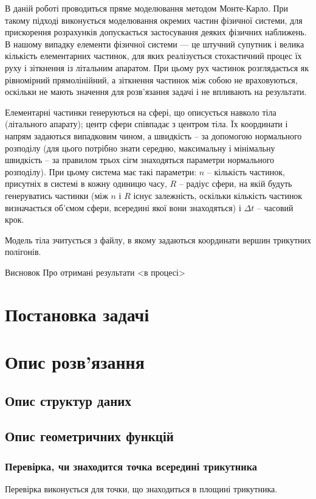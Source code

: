 \documentclass[a4paper,12pt]{article}
\begin{document}
В даній роботі проводиться пряме моделювання методом Монте-Карло. При такому підході виконується моделювання окремих частин фізичної системи, для прискорення розрахунків допускається застосування деяких фізичних наближень. В нашому випадку елементи фізичної системи — це штучний супутник і велика кількість елементарних частинок, для яких реалізується стохастичний процес їх руху і зіткнення із літальним апаратом. При цьому рух частинок розглядається як рівномірний прямолінійний, а зіткнення частинок між собою не враховуються, оскільки не мають значення для розв’язання задачі і не впливають на результати.

Елементарні частинки генеруються на сфері, що описується навколо тіла (літального апарату); центр сфери співпадає з центром тіла. Їх координати і напрям задаються випадковим чином, а швидкість -- за допомогою нормального розподілу (для цього потрібно знати середню, максимальну і мінімальну швидкість -- за правилом трьох сігм знаходяться параметри нормального розподілу). При цьому система має такі параметри: $n$ -- кількість частинок, присутніх в системі в кожну одиницю часу, $R$ -- радіус сфери, на якій будуть генеруватись частинки (між $n$ і $R$ існує залежність, оскільки кількість частинок визначається об’ємом сфери, всередині якої вони знаходяться) і $\Delta t$ -- часовий крок.

Модель тіла зчитується з файлу, в якому задаються координати вершин трикутних полігонів. 

Висновок
Про отримані результати <в процесі>

\section{Постановка задачі}

\section{Опис розв’язання}
\subsection{Опис структур даних}

\subsection{Опис геометричних функцій}
\subsubsection{Перевірка, чи знаходится точка всередині трикутника}
Перевірка виконується для точки, що знаходиться в площині трикутника.
\end{document}
